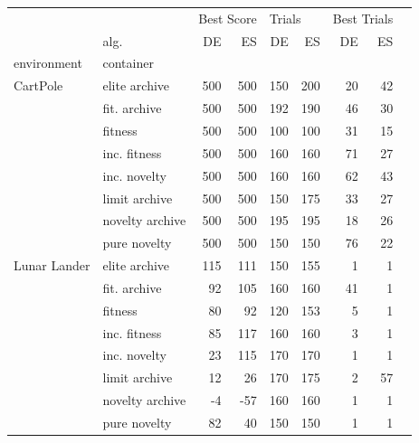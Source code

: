 \begin{tabular}{ll|rrrrrrr}
\toprule
             & {} & \multicolumn{2}{l}{Best Score} & \multicolumn{2}{l}{Trials} & \multicolumn{2}{l}{Best Trials} \\
             & alg. &         DE &  ES &     DE &  ES &          DE & ES \\
environment & container &            &     &        &     &             &    \\
\midrule
CartPole & elite archive &        500 & 500 &    150 & 200 &          20 & 42 \\
             & fit. archive &        500 & 500 &    192 & 190 &          46 & 30 \\
             & fitness &        500 & 500 &    100 & 100 &          31 & 15 \\
             & inc. fitness &        500 & 500 &    160 & 160 &          71 & 27 \\
             & inc. novelty &        500 & 500 &    160 & 160 &          62 & 43 \\
             & limit archive &        500 & 500 &    150 & 175 &          33 & 27 \\
             & novelty archive &        500 & 500 &    195 & 195 &          18 & 26 \\
             & pure novelty &        500 & 500 &    150 & 150 &          76 & 22 \\
Lunar Lander & elite archive &        115 & 111 &    150 & 155 &           1 &  1 \\
             & fit. archive &         92 & 105 &    160 & 160 &          41 &  1 \\
             & fitness &         80 &  92 &    120 & 153 &           5 &  1 \\
             & inc. fitness &         85 & 117 &    160 & 160 &           3 &  1 \\
             & inc. novelty &         23 & 115 &    170 & 170 &           1 &  1 \\
             & limit archive &         12 &  26 &    170 & 175 &           2 & 57 \\
             & novelty archive &         -4 & -57 &    160 & 160 &           1 &  1 \\
             & pure novelty &         82 &  40 &    150 & 150 &           1 &  1 \\
\bottomrule
\end{tabular}
